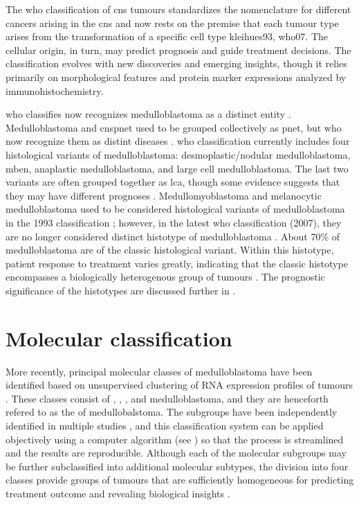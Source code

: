 The \gls{who} classification of \gls{cns} tumours standardizes the nomenclature for different cancers arising in the \gls{cns} and now rests on the premise that each tumour type arises from the transformation of a specific cell type \gls{kleihues93, who07}. The cellular origin, in turn, may predict prognosis and guide treatment decisions. The classification evolves with new discoveries and emerging insights, though it relies primarily on morphological features and protein marker expressions analyzed by immunohistochemistry.

\gls{who} classifies now recognizes medulloblastoma as a distinct entity . Medulloblastoma and \gls{cnspnet} used to be grouped collectively as \gls{pnet}, but \gls{who} now recognize them as distint diseases . \gls{who} classification currently includes four histological variants of medulloblastoma: desmoplastic/nodular medulloblastoma, \gls{mben}, anaplastic medulloblastoma, and large cell medulloblastoma. The last two variants are often grouped together as \gls{lca}, though some evidence suggests that they may have different prognoses . Medullomyoblastoma and melanocytic medulloblastoma used to be considered histological variants of medulloblastoma in the 1993 classification ; however, in the latest \gls{who} classification (2007), they are no longer considered distinct histotype of medulloblastoma . About 70\% of medulloblastoma are of the classic histological variant. Within this histotype, patient response to treatment varies greatly, indicating that the classic histotype encompasses a biologically heterogenous group of tumours . The prognostic significance of the histotypes are discussed further in .



\section{Molecular classification}

More recently, principal molecular classes of medulloblastoma have been identified based on unsupervised clustering of RNA expression profiles of tumours . These classes consist of , , , and  medulloblastoma, and they are henceforth refered to as the  of medullobalstoma. The subgroups have been independently identified in multiple studies , and this classification system can be applied objectively using a computer algorithm (see ) so that the process is streamlined and the results are reproducible. Although each of the molecular subgroups may be further subclassified into additional molecular subtypes, the division into four classes provide groups of tumours that are sufficiently homogeneous for predicting treatment outcome and revealing biological insights .

